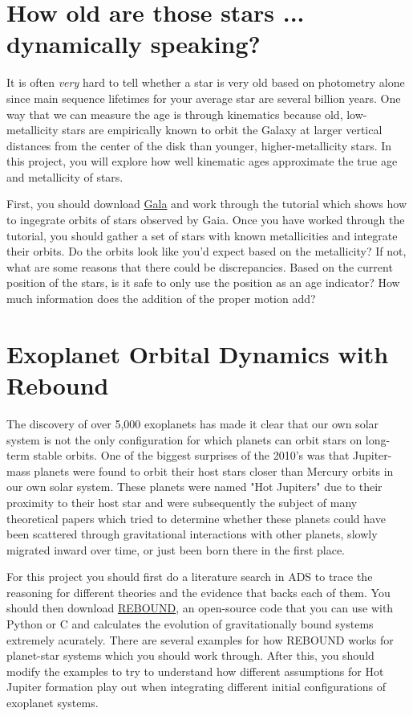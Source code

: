\documentclass[10pt]{extarticle}
\begin{document}
\section{How old are those stars ... dynamically speaking?}
It is often \emph{very} hard to tell whether a star is very old based on
photometry alone since main sequence lifetimes for your average star are several
billion years. One way that we can measure the age is through kinematics because
old, low-metallicity stars are empirically known to orbit the Galaxy at larger
vertical distances from the center of the disk than younger, higher-metallicity
stars. In this project, you will explore how well kinematic ages approximate the
true age and metallicity of stars.  

First, you should download
\href{https://gala.adrian.pw/en/latest/index.html}{Gala} and work through the
tutorial which shows how to ingegrate orbits of stars observed by Gaia. Once you
have worked through the tutorial, you should gather a set of stars with known
metallicities and integrate their orbits. Do the orbits look like you'd expect
based on the metallicity? If not, what are some reasons that there could be
discrepancies. Based on the current position of the stars, is it safe to only
use the position as an age indicator? How much information does the addition of
the proper motion add?


\section{Exoplanet Orbital Dynamics with Rebound}
The discovery of over 5,000 exoplanets has made it clear that our own solar
system is not the only configuration for which planets can orbit stars on
long-term stable orbits. One of the biggest surprises of the 2010's was that
Jupiter-mass planets were found to orbit their host stars closer than Mercury
orbits in our own solar system. These planets were named "Hot Jupiters" due to
their proximity to their host star and were subsequently the subject of many
theoretical papers which tried to determine whether these planets could have
been scattered through gravitational interactions with other planets, slowly
migrated inward over time, or just been born there in the first place. 

For this project you should first do a literature search in ADS to trace the
reasoning for different theories and the evidence that backs each of them. You
should then download \href{https://rebound.readthedocs.io/en/latest/}{REBOUND},
an open-source code that you can use with Python or C and calculates the
evolution of gravitationally bound systems extremely acurately. There are
several examples for how REBOUND works for planet-star systems which you should
work through. After this, you should modify the examples to try to understand
how different assumptions for Hot Jupiter formation play out when integrating
different initial configurations of exoplanet systems. 
\end{document}
